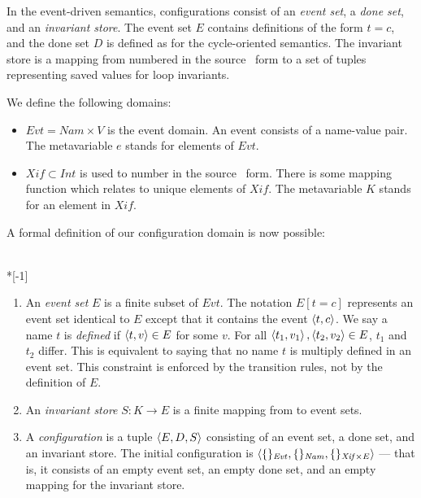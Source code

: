\documentclass[12pt,notitlepage,twoside]{article}
\begin{document}
In the event-driven semantics, configurations consist of an
\emph{event set}, a \emph{done set}, and an \emph{invariant store}.
The event set $E$ contains definitions of the form $t=c$, and the done
set $D$ is defined as for the cycle-oriented semantics.  The invariant
store is a mapping from numbered  in the source
\ssiplus\ form to a set of tuples representing saved values for loop
invariants.

We define the following domains:
\begin{itemize}
\item $\mathit{Evt} = \mathit{Nam} \times V$ is the event domain.  An
event consists of a name-value pair.  The metavariable $e$ stands for
elements of $\mathit{Evt}$.
\item $\mathit{Xif} \subset \mathit{Int}$ is used to number
 in the source \ssiplus\ form.  There is some mapping
function which relates  to unique elements of
$\mathit{Xif}$.  The metavariable $K$ stands for an element in
$\mathit{Xif}$.
\end{itemize}

A formal definition of our configuration domain is now possible:
\begin{definition}~\\*[-1\baselineskip]
\begin{enumerate}
\item An \emph{event set} $E$ is a finite subset of $\mathit{Evt}$.
The notation $E[t=c]$ represents an event set identical to $E$ except
that it contains the event $\left\langle t,c \right\rangle$.  We say a name $t$ is
\emph{defined} if $\left\langle t,v \right\rangle \in E$ for some $v$.  For all
$\left\langle t_1,v_1 \right\rangle,\left\langle t_2,v_2 \right\rangle \in E$, $t_1$ and $t_2$ differ.  This is
equivalent to saying that no name $t$ is multiply defined in an event
set.  This constraint is enforced by the transition rules, 
not by the definition of $E$.
\item An \emph{invariant store} $S: K \to E$ is a finite mapping from
 to event sets.
\item A \emph{configuration} is a tuple $\left\langle E, D, S \right\rangle$ consisting
of an event set, a done set, and an invariant store.  The initial
configuration is
$\left\langle \{\}_{\mathit{Evt}},
        \{\}_{\mathit{Nam}},
        \{\}_{\mathit{Xif} \times E} \right\rangle$ ---
that is, it consists of an empty event set, an empty done set, and
an empty mapping for the invariant store.
\end{enumerate}
\end{definition}
\end{document}

